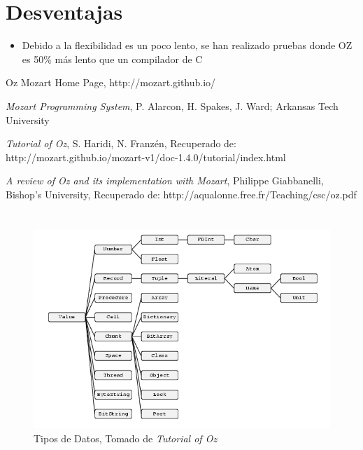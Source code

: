 \documentclass[10pt,journal,compsoc]{IEEEtran}
\begin{document}
\section{Desventajas}
\begin{itemize}
	\item Debido a la flexibilidad es un poco lento, se han realizado pruebas donde OZ es 50\% m\'as lento que un compilador de C
\end{itemize}

\begin{thebibliography}{1}
	
	Oz Mozart Home Page, http://mozart.github.io/
	
	\emph{Mozart Programming System}, P. Alarcon, H. Spakes, J. Ward; Arkansas Tech University
	
	\emph{Tutorial of Oz}, S. Haridi, N. Franzén, Recuperado de:
	http://mozart.github.io/mozart-v1/doc-1.4.0/tutorial/index.html
	
	\emph{A review of Oz and its implementation with Mozart}, Philippe Giabbanelli, Bishop’s University, Recuperado de: http://aqualonne.free.fr/Teaching/csc/oz.pdf
\end{thebibliography}

\appendices
\onecolumn
\section{}
\begin{figure}
	\centering
	\includegraphics[width=\textwidth]{datos.png}
	\caption{\label{fig:Datos}Tipos de Datos, Tomado de \emph{Tutorial of Oz}}
\end{figure}
\end{document}

